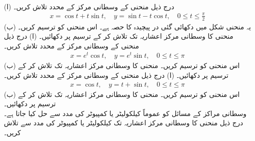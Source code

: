 \\
(ا) درج ذیل منحنی کے وسطانی مرکز کے محدد تلاش کریں۔
\begin{align*}
x=\cos t+t\sin t,\quad y=\sin t-t\cos t,\quad 0\le t\le\frac{\pi}{2}
\end{align*}
(ب) یہ منحنی شکل  میں دکھائی گئی در پیچیدہ کا حصہ ہے۔ اس منحنی کو  ترسیم کریں۔ منحنی کا وسطانی مرکز  اعشاریہ تک تلاش کر کے ترسیم  پر دکھائیں۔
(ا) درج ذیل منحنی کے وسطانی مرکز کے محدد تلاش کریں۔
\begin{align*}
x=e^t\cos t,\quad y=e^t\sin t,\quad 0\le t\le\pi
\end{align*}
(ب) اس منحنی کو  ترسیم کریں۔ منحنی کا وسطانی مرکز   اعشاریہ تک تلاش کر کے ترسیم  پر دکھائیں۔
(ا) درج ذیل منحنی کے وسطانی مرکز کے محدد تلاش کریں۔
\begin{align*}
x=\cos t,\quad y=t+\sin t,\quad 0\le t\le\pi
\end{align*}
(ب) اس منحنی کو  ترسیم کریں۔ منحنی کا وسطانی مرکز   اعشاریہ تک تلاش کر کے ترسیم  پر دکھائیں۔
\\
وسطانی مراکز کے مسائل کو عموماً کیلکولیٹر یا کمپیوٹر کی مدد سے حل کیا جاتا ہے۔درج ذیل منحنی کا وسطانی مرکز  اعشاریہ تک کیلکولیٹر یا کمپیوٹر کی مدد سے تلاش کریں۔

